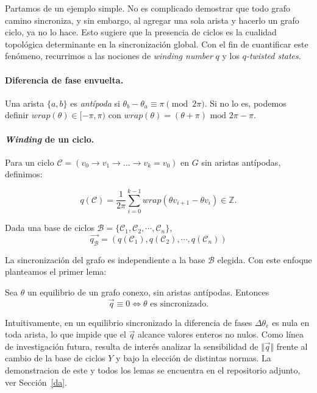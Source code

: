 Partamos de un ejemplo simple. No es complicado demostrar que todo grafo camino sincroniza, y sin embargo, al agregar una sola arista y hacerlo un grafo ciclo, ya no lo hace. Esto sugiere que la presencia de ciclos es la cualidad topológica determinante en la sincronización global. Con el fin de cuantificar este fenómeno, recurrimos a las nociones de \textit{winding number} \(q\) y los \(q\)\textit{-twisted states}.

\paragraph{Diferencia de fase envuelta.} Una arista $\{a,b\}$ es \emph{antípoda} si
$\theta_b-\theta_a\equiv\pi \pmod{2\pi}$. Si no lo es, podemos definir
$wrap(\theta)\in[-\pi,\pi)$ con \(wrap(\theta) = (\theta + \pi) \text{ mod } 2\pi - \pi\).

\paragraph{\textit{Winding} de un ciclo.} Para un ciclo $\mathcal{C}=(v_0\to v_1\to\dots\to v_k=v_0)$ en $G$ sin aristas antípodas, definimos:
\begin{eqbox}\[
q(\mathcal{C})=\frac1{2\pi}\sum_{i=0}^{k-1}wrap(\theta{v_{i+1}} - \theta{v_i})\in \mathbb{Z} .
\]\end{eqbox}
Dada una base de ciclos \(\mathcal{B} =\{ \mathcal{C}_1, \mathcal{C}_2, \cdots, \mathcal{C}_n\}\),
\begin{equation}
    \vec{q_\mathcal{B}} = (q(\mathcal{C}_1), q(\mathcal{C}_2), \cdots, q(\mathcal{C}_n))
\end{equation}

La sincronización del grafo es independiente a la base \(\mathcal{B}\) elegida. Con este enfoque planteamos el primer lema:

\begin{lema}[]
Sea $\theta$ un equilibrio de un grafo conexo, sin aristas antípodas. Entonces
\[
\vec{q}\equiv0\iff\theta\text{ es sincronizado}.
\]
\end{lema}



Intuitivamente, en un equilibrio sincronizado la diferencia de fases $\Delta\theta_e$ es nula en toda arista, lo que impide que el \(\vec{q}\) alcance valores enteros no nulos. Como línea de investigación futura, resulta de interés analizar la sensibilidad de $\Vert{}\vec{q}\Vert{}$ frente al cambio de la base de ciclos $Y$ y bajo la elección de distintas normas. La demonstracion de este y todos los lemas se encuentra en el repositorio adjunto, ver Sección~\ref{da}.

